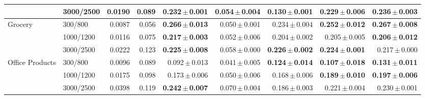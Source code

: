 \begin{table}[t]
\begin{tabular}{llrrrrrrr}
 & 3000/2500 & 0.0190 & 0.089 & \textbf{0.232}\,$\pm$\,\textbf{0.001} & 0.054\,$\pm$\,0.004 & 0.130\,$\pm$\,0.001 & \textbf{0.229}\,$\pm$\,\textbf{0.006} & \textbf{0.236}\,$\pm$\,\textbf{0.003} \\
\midrule
\multirow{3}{*}{Grocery} & 300/800 & 0.0087 & 0.056 & \textbf{0.266}\,$\pm$\,\textbf{0.013} & 0.050\,$\pm$\,0.001 & 0.234\,$\pm$\,0.004 & \textbf{0.252}\,$\pm$\,\textbf{0.012} & \textbf{0.267}\,$\pm$\,\textbf{0.008} \\
 & 1000/1200 & 0.0116 & 0.075 & \textbf{0.217}\,$\pm$\,\textbf{0.003} & 0.052\,$\pm$\,0.006 & 0.204\,$\pm$\,0.002 & 0.205\,$\pm$\,0.005 & \textbf{0.206}\,$\pm$\,\textbf{0.012} \\
 & 3000/2500 & 0.0222 & 0.123 & \textbf{0.225}\,$\pm$\,\textbf{0.008} & 0.058\,$\pm$\,0.000 & \textbf{0.226}\,$\pm$\,\textbf{0.002} & \textbf{0.224}\,$\pm$\,\textbf{0.001} & 0.217\,$\pm$\,0.000 \\
\midrule
\multirow{3}{*}{Office Products} & 300/800 & 0.0096 & 0.089 & 0.092\,$\pm$\,0.013 & 0.041\,$\pm$\,0.005 & \textbf{0.124}\,$\pm$\,\textbf{0.014} & \textbf{0.107}\,$\pm$\,\textbf{0.018} & \textbf{0.131}\,$\pm$\,\textbf{0.011} \\
 & 1000/1200 & 0.0175 & 0.098 & 0.173\,$\pm$\,0.006 & 0.050\,$\pm$\,0.006 & 0.168\,$\pm$\,0.006 & \textbf{0.189}\,$\pm$\,\textbf{0.010} & \textbf{0.197}\,$\pm$\,\textbf{0.006} \\
 & 3000/2500 & 0.0398 & 0.119 & \textbf{0.242}\,$\pm$\,\textbf{0.007} & 0.070\,$\pm$\,0.004 & 0.186\,$\pm$\,0.003 & 0.221\,$\pm$\,0.004 & 0.230\,$\pm$\,0.001 \\
\bottomrule
\end{tabular}
\end{table}
